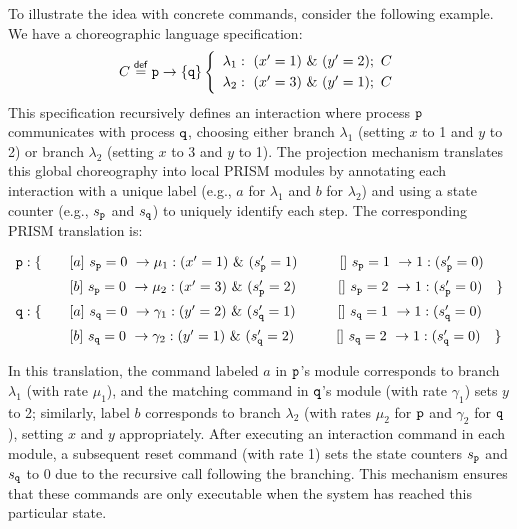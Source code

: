 To illustrate the idea with concrete commands, consider the following
example. We have a choreographic language specification:
%
\[
  \begin{array}{lll}
    C \stackrel{\mathsf{def}}{=} \mathtt{p}\rightarrow \{\mathtt{q}\}
    \left\{
    \begin{array}{lll}
      \lambda_1: \ (x'=1)\ \&\ (y'=2);\ C\\[1mm]
      \lambda_2: \ (x'=3)\ \&\ (y'=1);\ C
    \end{array}
    \right.
  \end{array}
\]
%
This specification recursively defines an interaction where process
\(\mathtt{p}\) communicates with process \(\mathtt{q}\), choosing either
branch \(\lambda_1\) (setting \(x\) to 1 and \(y\) to 2) or branch
\(\lambda_2\) (setting \(x\) to 3 and \(y\) to 1).  The projection
mechanism translates this global choreography into local PRISM modules
by annotating each interaction with a unique label (e.g., \(a\) for
\(\lambda_1\) and \(b\) for \(\lambda_2\)) and using a state counter
(e.g., \(s_{\mathtt{p}}\) and \(s_{\mathtt{q}}\)) to uniquely identify each
step.  The corresponding PRISM translation is:

\[
\begin{array}{llll}
\role{p}: \{ & \quad \commandBase {a}{s_{\role p}=0} {\mu_1:(x'=1)\ \&\ (s_{\role p}'=1)} \quad\qquad \commandBase {}{s_{\role p}=1} {1:(s_{\role p}'=0)}\\[2mm]
              & \quad \commandBase {b}{s_{\role p}=0} {\mu_2:(x'=3)\ \&\ (s_{\role p}'=2)} \quad\qquad \commandBase {}{s_{\role p}=2} {1:(s_{\role p}'=0)} \quad \}\\[2mm]
\role{q}: \{ & \quad \commandBase {a}{s_{\role q}=0} {\gamma_1:(y'=2)\ \&\ (s_{\role q}'=1)} \qquad\quad \commandBase {}{s_{\role q}=1} {1:(s_{\role q}'=0)}\\[2mm]
              & \quad \commandBase {b}{s_{\role q}=0} {\gamma_2:(y'=1)\ \&\ (s_{\role q}'=2)} \qquad\quad \commandBase {}{s_{\role q}=2} {1:(s_{\role q}'=0)} \quad \}\\
\end{array}
\]

In this translation, the command labeled \(a\) in \(\mathtt{p}\)’s module corresponds to branch \(\lambda_1\) (with rate \(\mu_1\)), and the matching command in \(\mathtt{q}\)’s module (with rate \(\gamma_1\)) sets \(y\) to 2; similarly, label \(b\) corresponds to branch \(\lambda_2\) (with rates \(\mu_2\) for \(\mathtt{p}\) and \(\gamma_2\) for \(\mathtt{q}\)), setting \(x\) and \(y\) appropriately. 
After executing an interaction command in each module, a subsequent reset command (with rate 1) sets the state counters \( s_{\mathtt{p}} \) and \( s_{\mathtt{q}} \) to 0 due to the recursive call following the branching. This mechanism ensures that these commands are only executable when the system has reached this particular state.


